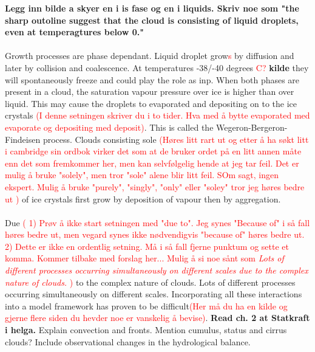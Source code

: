 \textbf{Legg inn bilde a skyer en i is fase og en i liquids. Skriv noe som "the sharp outoline suggest that the cloud is consisting of liquid droplets, even at temperagtures below 0."}
\\ \\ 
Growth processes are phase dependant. Liquid droplet grow\textcolor{red}{s} by diffusion and later by collision and coalescence. At temperatures -38/-40 degrees \textcolor{red}{C?} \textbf{kilde} they will spontaneously freeze and could play the role as \acrshort{inp}. When both phases are present in a cloud, the saturation vapour pressure over ice is higher than over liquid. This may cause the droplets to evaporated and depositing on to the ice crystals  \textcolor{red}{(I denne setningen skriver du i to tider. Hva med å bytte evaporated med evaporate og depositing med deposit)}. This is called the Wegeron-Bergeron-Findeisen process. Clouds consisting sole  \textcolor{red}{(Høres litt rart ut og etter å ha søkt litt i cambridge sin ordbok virker det som at de bruker ordet på en litt annen måte enn det som fremkommer her, men kan selvfølgelig hende at jeg tar feil. Det er mulig å bruke "solely", men tror "sole" alene blir litt feil. SOm sagt, ingen ekspert. Mulig å bruke "purely", "singly", "only" eller "soley" tror jeg høres bedre ut )} of ice crystals first grow by deposition of vapour then by aggregation. 
\\ \\ 
Due  \textcolor{red}{( 1) Prøv å ikke start setningen med "due to". Jeg synes "Because of" i så fall høres bedre ut, men vegard synes ikke nødvendigvis "because of" høres bedre ut. 2) Dette er ikke en ordentlig setning. Må i så fall fjerne punktum og sette et komma. Kommer tilbake med forslag her... Mulig å si noe sånt som \textit{Lots of different processes occurring simultaneously on different scales due to the complex nature of clouds.} )} to the complex nature of clouds. Lots of different processes occurring simultaneously on different scales. Incorporating all these interactions into a model framework has proven to be difficult\textcolor{red}{(Her må du ha en kilde og gjerne flere siden du hevder noe er vanskelig å bevise)}. \textbf{Read ch. 2 at Statkraft i helga.} Explain convection and fronts. Mention cumulus, status and cirrus clouds?
Include observational changes in the hydrological balance. 

